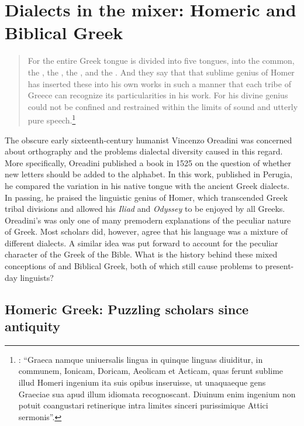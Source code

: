 \chapter{Dialects in the mixer: Homeric and Biblical Greek}\label{chap:4}
\begin{quote}
For the entire Greek tongue is divided into five tongues, into the common, the , the , the , and the . And they say that that sublime genius of Homer has inserted these into his own works in such a manner that each tribe of Greece can recognize its particularities in his work. For his divine genius could not be confined and restrained within the limits of sound and utterly pure  speech.\footnote{\citet[{\textsc{e}}.iii\textsc{\textsuperscript{v}}]{Oreadini1525}: “Graeca namque uniuersalis lingua in quinque linguas diuiditur, in communem, Ionicam, Doricam, Aeolicam et Acticam, quas ferunt sublime illud Homeri ingenium ita suis opibus inseruisse, ut unaquaeque gens Graeciae sua apud illum idiomata recognoscant. Diuinum enim ingenium non potuit coangustari retinerique intra limites sinceri purissimique Attici sermonis”.}
\end{quote}

The obscure early sixteenth-century  humanist Vincenzo Oreadini was concerned about  orthography and the problems dialectal diversity caused in this regard. More specifically, Oreadini published a book in 1525 on the question of whether new letters should be added to the  alphabet. In this work, published in Perugia, he compared the variation in his native tongue with the ancient Greek dialects. In passing, he praised the linguistic genius of Homer, which transcended Greek tribal divisions and allowed his \textit{Iliad} and \textit{Odyssey} to be enjoyed by all Greeks. Oreadini’s was only one of many premodern explanations of the peculiar nature of  Greek. Most scholars did, however, agree that his language was a mixture of different dialects. A similar idea was put forward to account for the peculiar character of the Greek of the Bible. What is the history behind these mixed conceptions of  and Biblical Greek, both of which still cause problems to present-day linguists?

\section{Homeric Greek: Puzzling scholars since antiquity}\label{sec:4.1}

